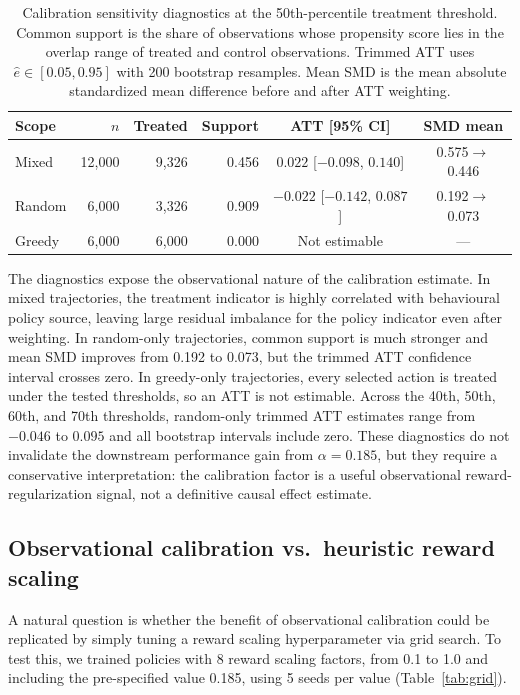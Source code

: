 \documentclass[11pt]{article}
\begin{document}
\begin{table}[htbp]
\centering
\scriptsize
\setlength{\tabcolsep}{2pt}
\caption{Calibration sensitivity diagnostics at the 50th-percentile treatment threshold. Common support is the share of observations whose propensity score lies in the overlap range of treated and control observations. Trimmed ATT uses $\hat{e}\in[0.05,0.95]$ with 200 bootstrap resamples. Mean SMD is the mean absolute standardized mean difference before and after ATT weighting.}
\label{tab:calibration_sensitivity}
\begin{tabular}{lrrrcc}
\toprule
Scope & $n$ & Treated & Support & ATT [95\% CI] & SMD mean \\
\midrule
Mixed & 12{,}000 & 9{,}326 & 0.456 & $0.022$ [$-0.098$, $0.140$] & 0.575$\to$0.446 \\
Random & 6{,}000 & 3{,}326 & 0.909 & $-0.022$ [$-0.142$, $0.087$] & 0.192$\to$0.073 \\
Greedy & 6{,}000 & 6{,}000 & 0.000 & Not estimable & --- \\
\bottomrule
\end{tabular}
\end{table}

The diagnostics expose the observational nature of the calibration estimate. In mixed trajectories, the treatment indicator is highly correlated with behavioural policy source, leaving large residual imbalance for the policy indicator even after weighting. In random-only trajectories, common support is much stronger and mean SMD improves from 0.192 to 0.073, but the trimmed ATT confidence interval crosses zero. In greedy-only trajectories, every selected action is treated under the tested thresholds, so an ATT is not estimable. Across the 40th, 50th, 60th, and 70th thresholds, random-only trimmed ATT estimates range from $-0.046$ to $0.095$ and all bootstrap intervals include zero. These diagnostics do not invalidate the downstream performance gain from $\alpha=0.185$, but they require a conservative interpretation: the calibration factor is a useful observational reward-regularization signal, not a definitive causal effect estimate.

\subsection{Observational calibration vs.\ heuristic reward scaling}
\label{sec:grid_search}

A natural question is whether the benefit of observational calibration could be replicated by simply tuning a reward scaling hyperparameter via grid search. To test this, we trained policies with 8 reward scaling factors, from 0.1 to 1.0 and including the pre-specified value 0.185, using 5 seeds per value (Table~\ref{tab:grid}).
\end{document}
